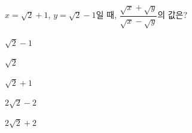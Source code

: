 \hspace*{2mm}\begin{minipage}[t]{\dimexpr\linewidth-2mm\relax}\vspace{0pt}
$x=\sqrt{2}+1$, $y=\sqrt{2}-1$일 때, $\dfrac{\sqrt{x}+\sqrt{y}}{\sqrt{x}-\sqrt{y}}$의 값은?
\begin{choices32}{\rule[-3ex]{0pt}{8ex}$\sqrt{2}-1$}{\rule[-3ex]{0pt}{8ex}$\sqrt{2}$}{\rule[-3ex]{0pt}{8ex}$\sqrt{2}+1$}{\rule[-3ex]{0pt}{8ex}$2\sqrt{2}-2$}{\rule[-3ex]{0pt}{8ex}$2\sqrt{2}+2$}\end{choices32}\end{minipage}
